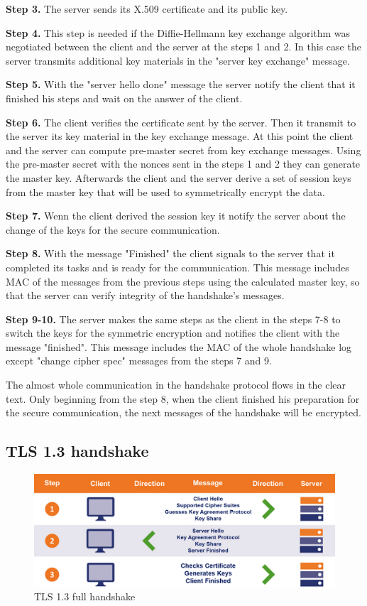 \textbf{Step 3.} The server sends its X.509 certificate and its public key.

\textbf{Step 4.} This step is needed if the Diffie-Hellmann key exchange algorithm was negotiated between the client and the server at the steps 1 and 2. In this case the server transmits additional key materials in the "server key exchange" message.

\textbf{Step 5.} With the "server hello done" message the server notify the client that it finished his steps and wait on the answer of the client.

\textbf{Step 6.} The client verifies the certificate sent by the server. Then it transmit to the server its key material in the key exchange message. 
At this point the client and the server can compute pre-master secret from key exchange messages. Using the pre-master secret with the nonces sent in the steps 1 and 2 they can generate the master key. Afterwards the client and the server derive a set of session keys from the master key that will be used to symmetrically encrypt the data.

\textbf{Step 7.} Wenn the client derived the session key it notify the server about the change of the keys for the secure communication.

\textbf{Step 8.} With the message "Finished" the client signals to the server that it completed its tasks and is ready for the communication. This message includes MAC of the messages from the previous steps using the calculated master key, so that the server can verify integrity of the handshake's messages.

\textbf{Step 9-10.} The server makes the same steps as the client in the steps 7-8 to switch the keys for the symmetric encryption and notifies the client with the message "finished". This message includes the MAC of the whole handshake log except "change cipher spec" messages from the steps 7 and 9. \cite{sslstore:handshake}\cite{Hassenstein}

The almost whole communication in the handshake protocol flows in the clear text. Only beginning from the step 8, when the client finished his preparation for the secure communication, the next messages of the handshake will be encrypted.

\subsection{TLS 1.3 handshake}
\label{subsec:handshake1_3}

\begin{figure}[H]
	\centering
		\includegraphics[scale=0.35]{images/handshake1_3.jpg}
	\caption{TLS 1.3 full handshake \cite{sslstore:handshake}}
	\label{fig:handshake1_3}
\end{figure}

